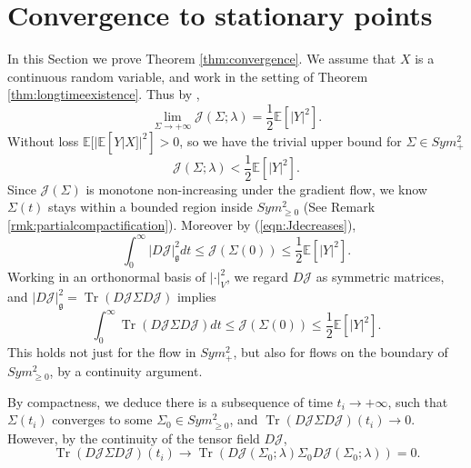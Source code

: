 \documentclass[a4paper]{article}
\theoremstyle{definition}
\newcommand{\E}{\mathbb{E}}
\newcommand{\1}{\mathbbm{1}}
\DeclareMathOperator{\Tr}{Tr}
\begin{document}
	
	
	
	
	
	\section{Convergence to stationary points}\label{sect:convergence}
	
	
	
	
	In this Section we prove Theorem \ref{thm:convergence}.
	We assume that $X$ is a continuous random variable, and work in the setting of Theorem \ref{thm:longtimeexistence}. Thus by \cite[Corollary 6.2]{RuanLi},
	\begin{equation}
		\lim_{ \Sigma\to +\infty} \mathcal{J}(\Sigma;\lambda) = \frac{1}{2} \E[|Y|^2].  
	\end{equation}
	Without loss $\E[|  \E[Y|X]  |^2]>0$, so we have the trivial upper bound for $\Sigma\in Sym^2_+$ \cite[Lemma 2.3]{RuanLi} 
	\[
	\mathcal{J}(\Sigma;\lambda) < \frac{1}{2} \E[|Y|^2].
	\]
	Since $\mathcal{J}(\Sigma)$ is monotone non-increasing under the gradient flow, we know $\Sigma(t)$ stays within a bounded region inside $Sym^2_{\geq 0}$ (See Remark \ref{rmk:partialcompactification}). Moreover by (\ref{eqn:Jdecreases}), 
	\[
	\int_0^\infty |D\mathcal{J} |_{\mathfrak{g}}^2  dt\leq \mathcal{J}(\Sigma(0)) \leq \frac{1}{2}\E[|Y|^2].
	\]
	Working in an orthonormal basis of $|\cdot|_V^2$, we regard $D\mathcal{J}$ as symmetric matrices, and $|D\mathcal{J}|_{\mathfrak{g}}^2= \Tr(D\mathcal{J} \Sigma D\mathcal{J} ) $ implies
	\[
	\int_0^\infty \Tr( D\mathcal{J} \Sigma D\mathcal{J}      ) dt\leq \mathcal{J}(\Sigma(0)) \leq \frac{1}{2}\E[|Y|^2].
	\]
	This holds not just for the flow in $Sym^2_+$, but also for flows on the boundary of $Sym^2_{\geq 0}$, by a continuity argument.
	
	
	
	
	
	
	
	
	
	
	
	
	
	
	By compactness, we deduce
	there is a subsequence of time $t_i\to +\infty$, such that 
	$\Sigma(t_i)$ converges to some $\Sigma_0\in Sym^2_{\geq 0}$, and 
	$ \Tr( D\mathcal{J} \Sigma D\mathcal{J}      ) (t_i) \to 0.$
	However, by the continuity of the tensor field $D\mathcal{J}$, 
	\[
	\Tr( D\mathcal{J} \Sigma D\mathcal{J}      ) (t_i) \to  \Tr( D\mathcal{J}(\Sigma_0;\lambda) \Sigma_0 D\mathcal{J} (\Sigma_0;\lambda)     )=0.
	\]
	
\end{document}
